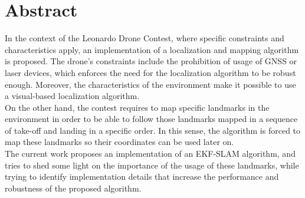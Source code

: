 
\begingroup
\let\clearpage\relax
\let\cleardoublepage\relax
\let\cleardoublepage\relax
{}
{}

\chapter*{Abstract}

In the context of the Leonardo Drone Contest, where specific constraints and characteristics apply, an implementation of a localization and mapping algorithm is proposed. The drone's constraints include the prohibition of usage of GNSS or laser devices, which enforces the need for the localization algorithm to be robust enough. Moreover, the characteristics of the environment make it possible to use a visual-based localization algorithm. \\

On the other hand, the contest requires to map specific landmarks in the environment in order to be able to follow those landmarks mapped in a sequence of take-off and landing in a specific order. In this sense, the algorithm is forced to map these landmarks so their coordinates can be used later on.\\

The current work proposes an implementation of an EKF-SLAM algorithm, and tries to shed some light on the importance of the usage of these landmarks, while trying to identify implementation details that increase the performance and robustness of the proposed algorithm.

\vfill
\newpage
{}
